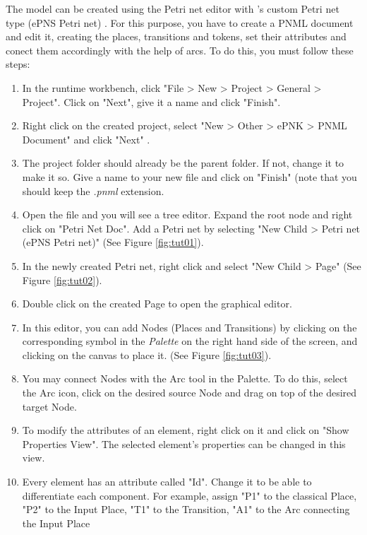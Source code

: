 The model can be created using the Petri net editor  with \epns's custom Petri net type (ePNS Petri net) 
. For this purpose, you have to create a PNML document and edit it, creating the places, transitions 
and tokens, set their attributes and conect them accordingly with the help of arcs. To do this, you must follow these steps:

\begin{enumerate}
  \item In the runtime workbench, click "File > New > Project > General > Project". Click on "Next", give it a 
  name and click "Finish".
  \item Right click on the created project, select "New > Other > ePNK > PNML Document" and click "Next" .
  \item The project folder should already be the parent folder. If not, change it to make it so. Give a name to 
  your new file and click on "Finish" (note that you should keep the \textit{.pnml} extension.
  \item Open the file and you will see a tree editor. Expand the root node and right click on "Petri Net Doc". 
  Add a Petri net by selecting "New Child > Petri net (ePNS Petri net)" (See Figure \ref{fig:tut01}).
  \item In the newly created Petri net, right click and select "New Child > Page" (See Figure \ref{fig:tut02}).
  \item Double click on the created Page to open the graphical editor.
  \item In this editor, you can add Nodes (Places and Transitions) by clicking on the corresponding symbol in the 
  \textit{Palette} on the right hand side of the screen, and clicking on the canvas to place it. (See Figure \ref{fig:tut03}).
  \item You may connect Nodes with the Arc tool in the Palette. To do this, select the Arc icon, click on the desired 
  source Node and drag on top of the desired target Node.
  \item To modify the attributes of an element, right click on it and click on "Show Properties View".  
  The selected element's properties can be changed in this view.
  \item Every element has an attribute called "Id". Change it to be able to differentiate each component. For example, 
  assign "P1" to the classical Place, "P2" to the Input Place, "T1" to the Transition, "A1" to the Arc connecting the Input Place 

\end{enumerate}
